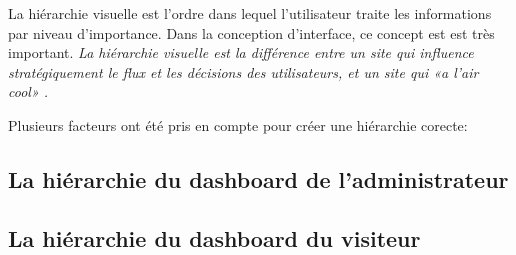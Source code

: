 La hiérarchie visuelle est l'ordre dans lequel l'utilisateur traite les informations par niveau d'importance.
Dans la conception d'interface, ce concept est est très important.
\textit{La hiérarchie visuelle est la différence entre un site qui influence stratégiquement le flux et les 
décisions des utilisateurs, et un site qui «a l'air cool» \cite{cao20155}.}
\par 
Plusieurs facteurs ont été pris en compte pour créer une hiérarchie corecte:
\subsection{La hiérarchie du dashboard de l'administrateur}

\subsection{La hiérarchie du dashboard du visiteur}